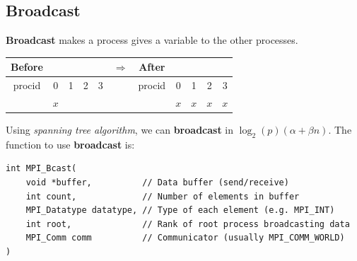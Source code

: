 \documentclass[12pt, openany]{report}
\theoremstyle{definition}
\begin{document}
\subsection{Broadcast}
\textbf{Broadcast} makes a process gives a variable to the other processes.\\
\begin{center}
	\begin{tabular}{ccccc|c|ccccc}
		Before &&&&& $\Longrightarrow$ &After&&&&\\
		\hline
		procid & 0 & 1 & 2 & 3 & & procid & 0 & 1 & 2 & 3\\
		\hline
		& $x$ &&&&& & $x$ & $x$ & $x$ & $x$\\
		\hline
	\end{tabular}
\end{center}
Using \textit{spanning tree algorithm}, we can \textbf{broadcast} in $\log_2(p)(\alpha + \beta n)$. The function to use \textbf{broadcast} is:
\begin{lstlisting}[style=CppStyle]
int MPI_Bcast(
    void *buffer,     	   // Data buffer (send/receive)
    int count,             // Number of elements in buffer
    MPI_Datatype datatype, // Type of each element (e.g. MPI_INT)
    int root,              // Rank of root process broadcasting data
    MPI_Comm comm          // Communicator (usually MPI_COMM_WORLD)
)
\end{lstlisting}
\end{document}
